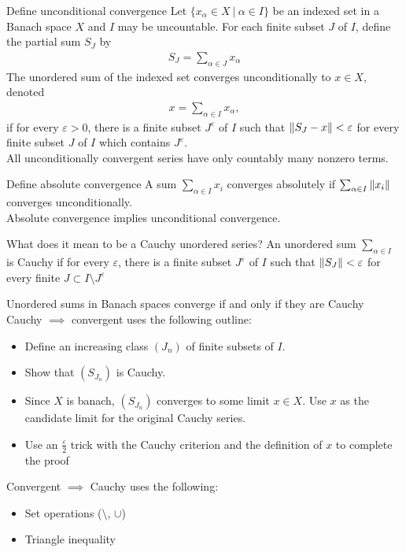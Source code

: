 \documentclass[avery5388,grid,frame]{flashcards}
\newcommand{\E}{\varepsilon}
\begin{document}
\begin{flashcard}
    {Define unconditional convergence}
    Let $\{x_\alpha \in X\ |\ \alpha \in I\}$ be an indexed set in a Banach space $X$ and $I$ may be uncountable.  For each finite subset $J$ of $I$, define the partial sum $S_J$ by
    \begin{align*}
        S_J = \sum_{\alpha\in J} x_\alpha
    \end{align*}
    The unordered sum of the indexed set converges unconditionally to $x \in X$, denoted
    \begin{align*}
        x = \sum_{\alpha \in I} x_\alpha,
    \end{align*}
    if for every $\E > 0$, there is a finite subset $J^\E$ of $I$ such that $\norm{S_J - x} < \E$ for every finite subset $J$ of $I$ which contains $J^\E$. \\

    All unconditionally convergent series have only countably many nonzero terms.
\end{flashcard}

\begin{flashcard}
    {Define absolute convergence}
    A sum $\sum_{\alpha \in I} x_i$ converges absolutely if $\sum_{\alpha \in I}\norm{x_i}$ converges unconditionally. \\

    Absolute convergence implies unconditional convergence.
\end{flashcard}

\begin{flashcard}
    {What does it mean to be a Cauchy unordered series?}
    An unordered sum $\sum_{\alpha \in I}$ is Cauchy if for every $\E$, there is a finite subset $J^\E$ of $I$ such that $\norm{S_J} < \E$ for every finite $J \subset I\setminus J^\E$
\end{flashcard}

\begin{flashcard}
    {Unordered sums in Banach spaces converge if and only if they are Cauchy}
    Cauchy $\implies$ convergent uses the following outline:
    \begin{itemize}
        \item Define an increasing class $(J_n)$ of finite subsets of $I$.
        \item Show that $(S_{J_n})$ is Cauchy.
        \item Since $X$ is banach, $(S_{J_n})$ converges to some limit $x \in X$.  Use $x$ as the candidate limit for the original Cauchy series.
        \item Use an $\frac{\E}{2}$ trick with the Cauchy criterion and the definition of $x$ to complete the proof
    \end{itemize}
    Convergent $\implies$ Cauchy uses the following:
    \begin{itemize}
        \item Set operations ($\setminus$, $\cup$)
        \item Triangle inequality
    \end{itemize}
\end{flashcard}
\end{document}
